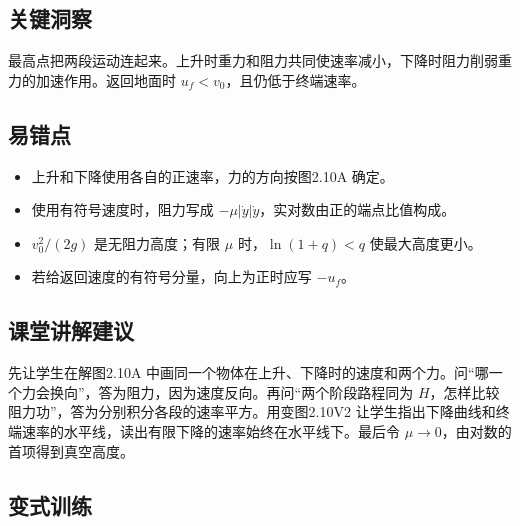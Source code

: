 \documentclass[UTF8,fontset=fandol,a4paper,11pt]{ctexart}
\begin{document}


\subsection*{关键洞察}

最高点把两段运动连起来。上升时重力和阻力共同使速率减小，下降时阻力削弱重力的加速作用。返回地面时 $u_f<v_0$，且仍低于终端速率。



\subsection*{易错点}

\begin{itemize}
\item 上升和下降使用各自的正速率，力的方向按图2.10A 确定。
\item 使用有符号速度时，阻力写成 $-\mu|\dot y|\dot y$，实对数由正的端点比值构成。
\item $v_0^2/(2g)$ 是无阻力高度；有限 $\mu$ 时，$\ln(1+q)<q$ 使最大高度更小。
\item 若给返回速度的有符号分量，向上为正时应写 $-u_f$。
\end{itemize}



\subsection*{课堂讲解建议}

先让学生在解图2.10A 中画同一个物体在上升、下降时的速度和两个力。问“哪一个力会换向”，答为阻力，因为速度反向。再问“两个阶段路程同为 $H$，怎样比较阻力功”，答为分别积分各段的速率平方。用变图2.10V2 让学生指出下降曲线和终端速率的水平线，读出有限下降的速率始终在水平线下。最后令 $\mu\to0$，由对数的首项得到真空高度。



\subsection*{变式训练}
\end{document}
